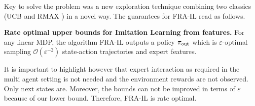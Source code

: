 \documentclass{article}
\begin{document}
Key to solve the problem was a new exploration technique combining two classics (UCB \cite{azar2017minimax} and RMAX \citep{brafman2002r}) in a novel way.
The guarantees for FRA-IL read as follows.
\begin{tcolorbox}[
    colback=orange!10!white,
    colframe=orange!80!black,
    width=\linewidth
  ]
\begin{theorem} \textbf{Rate optimal upper bounds for Imitation Learning from features.}
    For any linear MDP, the algorithm FRA-IL outputs a policy $\pi_{\mathrm{out}}$ which is $\varepsilon$-optimal sampling $\mathcal{O}(\varepsilon^{-2})$ state-action trajectories and expert features.
\end{theorem}
\end{tcolorbox}
It is important to highlight however that expert interaction as required in the multi agent setting is not needed and the environment rewards are not observed. Only next states are.
Moreover, the bounds can not be improved in terms of $\varepsilon$ because of our lower bound. Therefore, FRA-IL is rate optimal.
\end{document}

